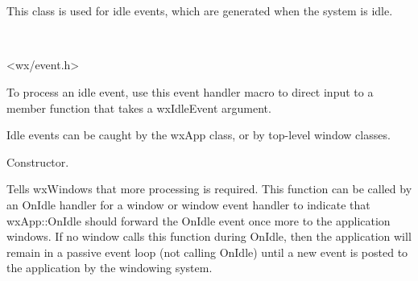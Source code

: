\section{}\label{wxidleevent}

This class is used for idle events, which are generated when the system is idle.


\\


<wx/event.h>


To process an idle event, use this event handler macro to direct input to a member
function that takes a wxIdleEvent argument.

\twocolwidtha{7cm}
\begin{twocollist}\itemsep=0pt
\end{twocollist}%


Idle events can be caught by the wxApp class, or by top-level window classes.






Constructor.

\label{wxidleeventrequestmore}


Tells wxWindows that more processing is required. This function can be called by an OnIdle
handler for a window or window event handler to indicate that wxApp::OnIdle should
forward the OnIdle event once more to the application windows. If no window calls this function
during OnIdle, then the application will remain in a passive event loop (not calling OnIdle) until a
new event is posted to the application by the windowing system.


